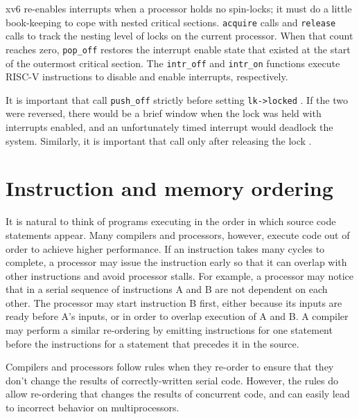 xv6 re-enables interrupts when a processor holds no spin-locks; it must
do a little book-keeping to cope with nested critical sections.
\lstinline{acquire}
calls
and
\lstinline{release}
calls
to track the nesting level of locks on the current processor.
When that count reaches zero,
\lstinline{pop_off} 
restores the interrupt enable state that existed 
at the start of the outermost critical section.
The
\lstinline{intr_off}
and
\lstinline{intr_on}
functions execute RISC-V instructions to disable and enable
interrupts, respectively.

It is important that
call
\lstinline{push_off}
strictly before setting
\lstinline{lk->locked}
.
If the two were reversed, there would be
a brief window when the lock
was held with interrupts enabled, and
an unfortunately timed interrupt would deadlock the system.
Similarly, it is important that
call
only after 
releasing the lock
.
\section{Instruction and memory ordering}

It is natural to think of programs executing in the order
in which source code statements appear.
Many
compilers and processors, however, execute code out of order
to achieve
higher performance.  If an instruction takes many cycles to complete,
a processor may issue the instruction early so that it can
overlap with other instructions and avoid processor stalls. For
example, a processor may notice that in a serial sequence of
instructions A and B are not dependent on each other.
The processor may start instruction B first, either because its
inputs are ready before A's inputs, or in order to overlap
execution of A and B.
A compiler may perform a similar re-ordering by emitting instructions
for one statement before the instructions for a statement that precedes it
in the source.

Compilers and processors follow rules when they re-order to
ensure that they don't change the results of correctly-written
serial code.
However, the rules do allow re-ordering that
changes the results of concurrent code,
and can easily lead to incorrect behavior on multiprocessors.

